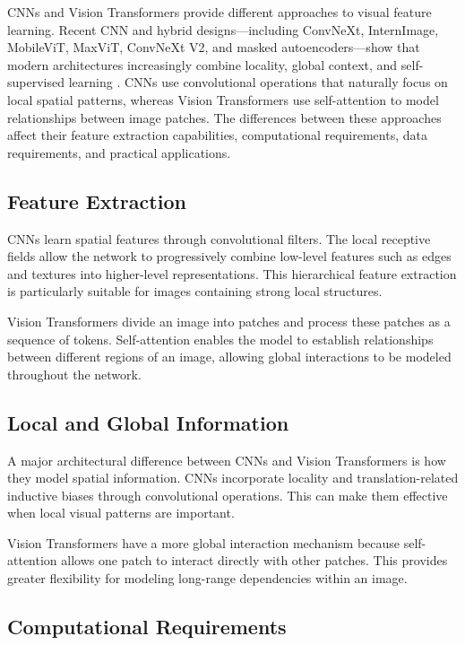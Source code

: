 \documentclass[conference]{IEEEtran}
\begin{document}
CNNs and Vision Transformers provide different approaches to visual feature learning. Recent CNN and hybrid designs—including ConvNeXt, InternImage, MobileViT, MaxViT, ConvNeXt V2, and masked autoencoders—show that modern architectures increasingly combine locality, global context, and self-supervised learning \cite{liu2022convnext,wang2023internimage,mehta2022mobilevit,tu2022maxvit,woo2023convnextv2,he2022mae}. CNNs use convolutional operations that naturally focus on local spatial patterns, whereas Vision Transformers use self-attention to model relationships between image patches. The differences between these approaches affect their feature extraction capabilities, computational requirements, data requirements, and practical applications.

\subsection{Feature Extraction}

CNNs learn spatial features through convolutional filters. The local receptive fields allow the network to progressively combine low-level features such as edges and textures into higher-level representations. This hierarchical feature extraction is particularly suitable for images containing strong local structures.

Vision Transformers divide an image into patches and process these patches as a sequence of tokens. Self-attention enables the model to establish relationships between different regions of an image, allowing global interactions to be modeled throughout the network.

\subsection{Local and Global Information}

A major architectural difference between CNNs and Vision Transformers is how they model spatial information. CNNs incorporate locality and translation-related inductive biases through convolutional operations. This can make them effective when local visual patterns are important.

Vision Transformers have a more global interaction mechanism because self-attention allows one patch to interact directly with other patches. This provides greater flexibility for modeling long-range dependencies within an image.

\subsection{Computational Requirements}
\end{document}
